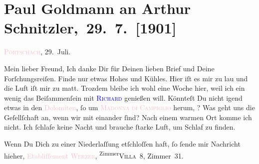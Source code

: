 

\renewcommand{\erwaehntePersonen}{Personen: Richard Beer-Hofmann, Olga Schnitzler, Elisabeth Steinrück}
\renewcommand{\erwaehnteOrte}{Orte: Dolomiten, Etablissement Werzer, Madonna di Campiglio, Pörtschach, Vahrn}
\renewcommand{\erwaehnteWerke}{}
\section[ Paul Goldmann an Arthur Schnitzler, 29. 7. {[}1901{]}]{Paul Goldmann an Arthur Schnitzler, 29. 7. {[}1901{]}}
\nopagebreak{}
\rehead{ }\normalsize\beginnumbering{}
\toendnotes[C]{\smallbreak\pagebreak[2]}
\toendnotes[C]{\smallbreak}
\pstart
           {\pb}\textsc{\textcolor{pink}{Pörtschach}{}\ledrightnote{\textcolor{pink}{Pörtschach}}}, 29. Juli.\pend
           
\pstart\center{}Mein lieber Freund,\pend
\pstart
           Ich danke Dir für Deinen lieben Brief und Deine Forſchungsreiſen. Finde nur etwas
               Hohes und Kühles. Hier iſt es mir zu lau und die Luft iſt mir zu matt. Trozdem bleibe
               ich wohl eine Woche hier, weil ich ein wenig das Beiſammenſein mit \textsc{\textcolor{blue}{Richard}{}\ledrightnote{\textcolor{blue}{Richard Beer-Hofmann}}} genießen will. Könnteſt Du nicht igend etwas in den \textcolor{pink}{Dolomiten}{}\ledrightnote{\textcolor{pink}{Dolomiten}}, ſo um \textsc{\textcolor{pink}{Madonna  di Campiglio}{}\ledrightnote{\textcolor{pink}{Madonna di Campiglio}}} herum, \label{K_L03075-3v}\label{K_L03075-3h}? Was geht uns die Geſellſchaft an, wenn \strikeout{\textcolor{gray}{×}} wir {\pb}mit einander ſind? Nach
               einem warmen Ort komme ich nicht. Ich ſchlafe keine Nacht und brauche ſtarke Luft, um
               Schlaf zu finden.\pend
           
\pstart
           Wenn Du Dich zu einer Niederlaſſung etſchloſſen haft, ſo ſende mir Nachricht hieher,
                  \textcolor{pink}{Etabliſſement \textsc{Werzer}}{}\ledrightnote{\textcolor{pink}{Etablissement Werzer}}, \substVorne{}\textsuperscript{Zimmer}{\allowbreak}\substDazwischen{}\textsc{Villa}\substHinten{} 8, Zimmer 31.\pend
           
